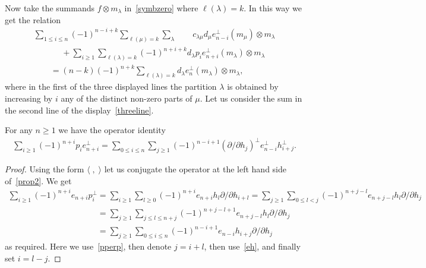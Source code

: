 Now take the summands $f\otimes m_\lambda$ in~\eqref{symbzero} where $\ell(\lambda)=k$.
In this way we get the relation
\begin{gather}
\sum_{1\le i\le n}(-1)^{n-i+k}\sum_{\ell(\mu)=k}\sum_\lambda
\qquad
c_{\lambda\mu}d_\mu e_{n-i}^{\perp}(m_\mu)\otimes m_\lambda
\nonumber
\\
\qquad\phantom{=}
{}+\sum_{i\ge1}\sum_{\ell(\lambda)=k}(-1)^{n+i+k}d_\lambda
p_ie_{n+i}^{\perp}(m_\lambda)\otimes m_\lambda
\nonumber
\\
\qquad{}
=(n-k)(-1)^{n+k}\sum_{\ell(\lambda)=k}d_\lambda e_n^{\perp}(m_\lambda)\otimes m_\lambda,
\label{threeline}
\end{gather}
where in the f\/irst of the three displayed lines the partition $\lambda$ is obtained by increasing by $i$
any of the distinct non-zero parts of $\mu$.
Let us consider the sum in the second line of the display~\eqref{threeline}.
\begin{proposition}\label{Prop2}
For any $n\ge1$ we have the operator identity
\begin{gather}
\label{prop2}
\sum_{i\ge1}(-1)^{n+i}p_ie_{n+i}^{\perp}
=\sum_{0\le i\le n}\sum_{j\ge1}(-1)^{n-i+1}(
\partial /\partial h_j)^{\perp}e_{n-i}
^{\perp}h_{i+j}^{\perp}.
\end{gather}
\end{proposition}
\begin{proof}
Using the form $\langle\;,\;\rangle$ let us conjugate the operator at the left hand side of~\eqref{prop2}.
We get
\begin{gather*}
\sum_{i\ge1}(-1)^{n+i}e_{n+i}p_i^{\perp}
=\sum_{i\ge1}\sum_{l\ge0}(-1)^{n+i}e_{n+i}h_{l}\partial /\partial h_{i+l}
=\sum_{j\ge1}\sum_{0\le l<j}(-1)^{n+j-l}e_{n+j-l}h_{l}\partial /\partial h_{j}
\\
\phantom{\sum_{i\ge1}(-1)^{n+i}e_{n+i}p_i^{\perp}}
=\sum_{j\ge1}\sum_{j\le l\le n+j}(-1)^{n+j-l+1}e_{n+j-l}h_{l}\partial /\partial h_{j}
\\
\phantom{\sum_{i\ge1}(-1)^{n+i}e_{n+i}p_i^{\perp}}
=\sum_{j\ge1}\sum_{0\le i\le n}(-1)^{n-i+1}e_{n-i}h_{i+j}\partial /\partial h_{j}
\end{gather*}
as required.
Here we use~\eqref{pperp}, then denote $j=i+l$, then use~\eqref{eh}, and f\/inally set
$i=l-j$.
\end{proof}

